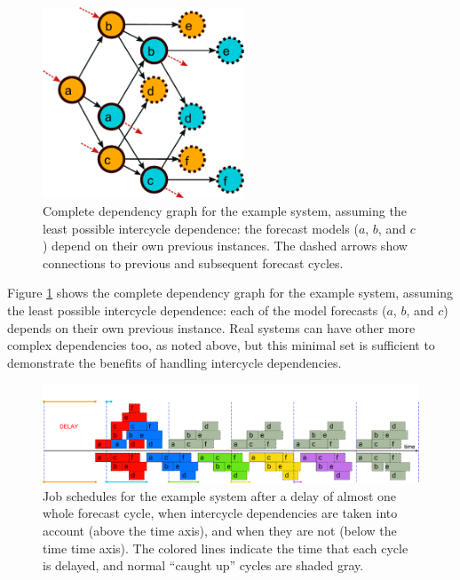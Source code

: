 \documentclass[11pt,a4paper]{article}
\begin{document}
\begin{figure} \begin{center}
    \includegraphics[width=6cm]{dependencies-two} \end{center}
    \caption{\small Complete dependency graph for the example
    system, assuming the least possible intercycle dependence: the
    forecast models ($a$, $b$, and $c$) depend on their own previous
    instances. The dashed arrows show connections to previous and
    subsequent forecast cycles.} 
    \label{fig-dep-two}
\end{figure}

Figure \ref{fig-dep-two} shows the complete dependency graph for the
example system, assuming the least possible intercycle dependence: each
of the model forecasts ($a$, $b$, and $c$) depends on their own previous
instance. Real systems can have other more complex dependencies too, as
noted above, but this minimal set is sufficient to demonstrate the
benefits of handling intercycle dependencies.

\begin{figure} 
    \begin{center} 
        \includegraphics[width=12cm]{timeline-three}
    \end{center} 
    \caption{\small Job schedules for the example system after a 
    delay of almost one whole forecast cycle, when intercycle
    dependencies are taken into account (above the time axis), and when
    they are not (below the time time axis). The colored lines indicate
    the time that each cycle is delayed, and normal ``caught up'' cycles
    are shaded gray.} 
    \label{fig-time-three}
\end{figure} 
\end{document}
